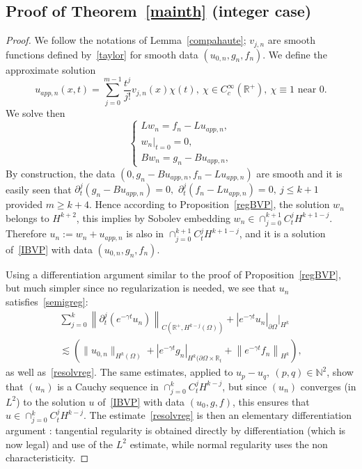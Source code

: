 \documentclass[10pt]{amsart}
\theoremstyle{definition}\newtheorem{defi}[theo]{Definition}\newtheorem{rema}[theo]{Remark}\newtheorem{exam}[theo]{Example}\newtheorem{exem}[theo]{Example}\newtheorem{nota}[theo]{Notation}
\newcommand{\R}{\mathbb{R}}
\newcommand{\N}{\mathbb{N}}
\begin{document}
\subsection{Proof of Theorem~\ref{mainth} (integer case)}
\begin{proof}
We follow the notations of Lemma~\ref{compahaute}; $v_{j,n}$ are smooth functions defined by~\eqref{taylor} for smooth data $(u_{0,n},g_n,f_n)$. We define the approximate solution
\[
u_{app,n}(x,t)=\sum_{j=0}^{m-1}\frac{t^j}{j!} v_{j,n}(x)\chi(t),\ \chi\in C_c^\infty (\R^+),\ \chi\equiv 1\text{ near 0}.
\]
We solve then
\[
\left\{
\begin{array}{ll}
Lw_n=f_n-Lu_{app,n},\\
w_n|_{t=0}=0,\\
Bw_n=g_n-Bu_{app,n},
\end{array}
\right.
\]
By construction, the data $(0,g_n-Bu_{app,n},f_n-Lu_{app,n})$ are smooth and it is easily seen that $\partial_t^j(g_n-Bu_{app,n})=0,$ $\partial_t^j(f_n-Lu_{app,n})=0,\ j\leq k+1$ provided $m\geq k+4$. Hence according to Proposition~\ref{regBVP}, the solution $w_n$ belongs to $H^{k+2}$, this implies by Sobolev embedding $w_n\in\cap_{j=0}^{k+1}C_t^jH^{k+1-j}$. Therefore $u_n:=w_n+u_{app,n}$ is also in $\cap_{j=0}^{k+1}C_t^jH^{k+1-j}$, and it is a solution of~\eqref{IBVP} with data $(u_{0,n},g_n,f_n)$.


Using a differentiation argument similar to the proof of Proposition~\ref{regBVP}, but much simpler since no regularization is needed, we see that $u_n$ satisfies~\eqref{semigreg}:
\begin{multline*}
\sum_{j=0}^k \left\|\partial_t^j\left(e^{-\gamma t}u_n\right)\right\|_{C\left(\R^+,H^{k-j}(\Omega)\right)}+ \left|e^{-\gamma t}u_n\right|_{\partial\Omega}|_{H^k}\\
\lesssim \left(\|u_{0,n}\|_{H^k(\Omega)}+ \left|e^{-\gamma t}g_n\right|_{H^k(\partial\Omega\times \R_t}
+\left\|e^{-\gamma t}f_n\right\|_{H^k}\right),
\end{multline*}
as well as~\eqref{resolvreg}. The same estimates, applied to $u_p-u_q,\ (p,q)\in \N^2$, show that $(u_n)$ is a Cauchy sequence in $\cap_{j=0}^kC_t^jH^{k-j}$, but since $(u_n)$ converges (in $L^2$) to the solution $u$ of~\eqref{IBVP} with data $(u_0,g,f)$, this ensures that $u\in
\cap_{j=0}^kC_t^jH^{k-j}$. The estimate~\eqref{resolvreg} is then an elementary differentiation argument : tangential regularity is obtained directly by differentiation (which is now legal) and use of the $L^2$ estimate, while normal regularity uses the non characteristicity.


\end{proof}
\end{document}
